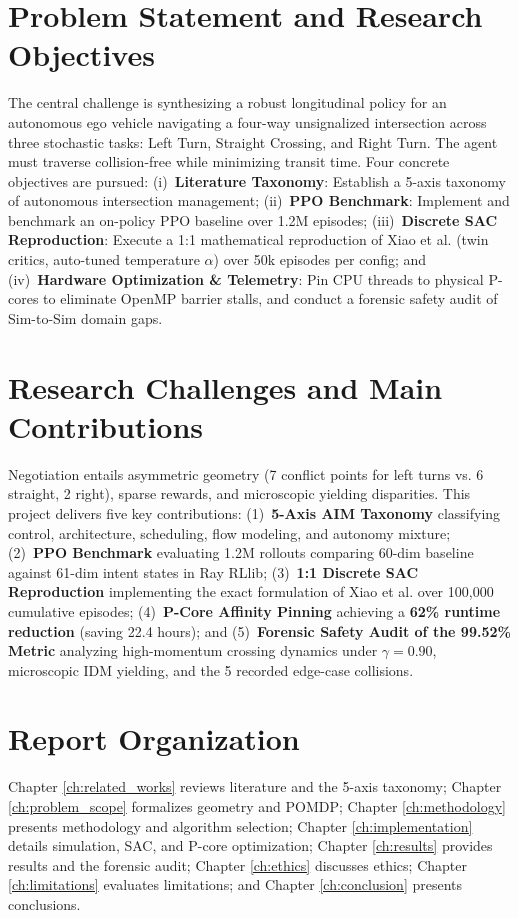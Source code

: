 \section{Problem Statement and Research Objectives}
The central challenge is synthesizing a robust longitudinal policy for an autonomous ego vehicle navigating a four-way unsignalized intersection across three stochastic tasks: Left Turn, Straight Crossing, and Right Turn. The agent must traverse collision-free while minimizing transit time. Four concrete objectives are pursued: (i)~\textbf{Literature Taxonomy}: Establish a 5-axis taxonomy of autonomous intersection management; (ii)~\textbf{PPO Benchmark}: Implement and benchmark an on-policy PPO baseline over 1.2M episodes; (iii)~\textbf{Discrete SAC Reproduction}: Execute a 1:1 mathematical reproduction of Xiao et al. \cite{xiao2024decision} (twin critics, auto-tuned temperature $\alpha$) over 50k episodes per config; and (iv)~\textbf{Hardware Optimization \& Telemetry}: Pin CPU threads to physical P-cores to eliminate OpenMP barrier stalls, and conduct a forensic safety audit of Sim-to-Sim domain gaps.

\section{Research Challenges and Main Contributions}
Negotiation entails asymmetric geometry (7 conflict points for left turns vs. 6 straight, 2 right), sparse rewards, and microscopic yielding disparities. This project delivers five key contributions: (1)~\textbf{5-Axis AIM Taxonomy} classifying control, architecture, scheduling, flow modeling, and autonomy mixture; (2)~\textbf{PPO Benchmark} evaluating 1.2M rollouts comparing 60-dim baseline against 61-dim intent states in Ray RLlib; (3)~\textbf{1:1 Discrete SAC Reproduction} implementing the exact formulation of Xiao et al. \cite{xiao2024decision} over 100,000 cumulative episodes; (4)~\textbf{P-Core Affinity Pinning} achieving a \textbf{62\% runtime reduction} (saving 22.4 hours); and (5)~\textbf{Forensic Safety Audit of the 99.52\% Metric} analyzing high-momentum crossing dynamics under $\gamma=0.90$, microscopic IDM yielding, and the 5 recorded edge-case collisions.

\section{Report Organization}
Chapter \ref{ch:related_works} reviews literature and the 5-axis taxonomy; Chapter \ref{ch:problem_scope} formalizes geometry and POMDP; Chapter \ref{ch:methodology} presents methodology and algorithm selection; Chapter \ref{ch:implementation} details simulation, SAC, and P-core optimization; Chapter \ref{ch:results} provides results and the forensic audit; Chapter \ref{ch:ethics} discusses ethics; Chapter \ref{ch:limitations} evaluates limitations; and Chapter \ref{ch:conclusion} presents conclusions.


